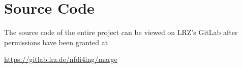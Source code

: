 \chapter{Source Code}

The source code of the entire project can be viewed on LRZ's GitLab after
permissions have been granted at

\url{https://gitlab.lrz.de/nfdi4ing/marge}

